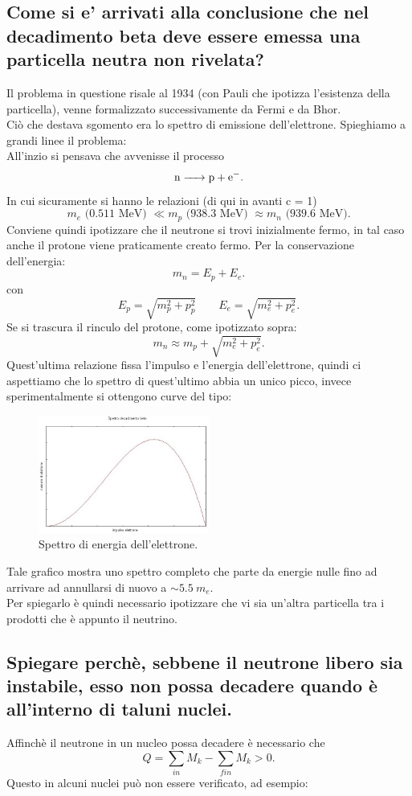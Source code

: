 \subsection[$\ $ Scoperta del neutrino nel decadimento $\beta^{-}$]{Come si e' arrivati alla conclusione che nel decadimento beta deve essere emessa una particella neutra non rivelata? }
Il problema in questione risale al 1934 (con Pauli che ipotizza l'esistenza della particella), venne formalizzato successivamente da Fermi e da Bhor.\\
Ciò che destava sgomento era lo spettro di emissione dell'elettrone. Spieghiamo a grandi linee il problema: \\
All'inzio si pensava che avvenisse il processo
\[
	\ce{n -> p + e-}
.\] 
In cui sicuramente si hanno le relazioni (di qui in avanti c = 1) 
\[
	m_e \text{ (0.511 MeV) }\ll m_p \text{ (938.3 MeV) } \approx m_n \text{ (939.6 MeV)}
.\] 
Conviene quindi ipotizzare che il neutrone si trovi inizialmente fermo, in tal caso anche il protone viene praticamente creato fermo. Per la conservazione dell'energia:
\[
	m_n =E_p + E_e
.\]
con 
\[
	E_p = \sqrt{m_p^2 + p_p^2} \quad \quad 
	E_e = \sqrt{m_e^2 + p_e^2} 
.\]
Se si trascura il rinculo del protone, come ipotizzato sopra:
\[
	m_n \approx m_p + \sqrt{m_e^2 + p_e^2} 
.\]
Quest'ultima relazione fissa l'impulso e l'energia dell'elettrone, quindi ci aspettiamo che lo spettro di quest'ultimo abbia un unico picco, invece sperimentalmente si ottengono curve del tipo:
\begin{figure}[H]
	\centering
	\includegraphics[width=0.5\textwidth]{immagini/Decadimento_beta_(spettro).jpg}
	\caption{Spettro di energia dell'elettrone.}
	\label{fig:beta}
\end{figure} 
Tale grafico mostra uno spettro completo che parte da energie nulle fino ad arrivare ad annullarsi di nuovo a $\sim 5.5 \ m_e$.\\
Per spiegarlo è quindi necessario ipotizzare che vi sia un'altra particella tra i prodotti che è appunto il neutrino.


\subsection[$\ $ Spiegazione dell'esistenza del neutrone nell'atomo]{Spiegare perchè, sebbene il neutrone libero sia instabile, esso non possa decadere quando è all'interno di taluni nuclei.}
Affinchè il neutrone in un nucleo possa decadere è necessario che
\[
	Q = \sum_{in} M_k - \sum_{fin} M_k > 0
.\] 
Questo in alcuni nuclei può non essere verificato, ad esempio:

